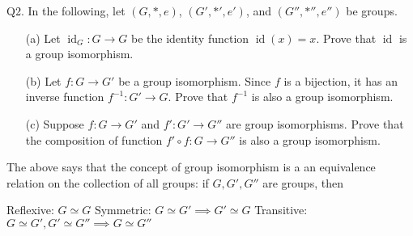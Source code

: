 \newpage
Q2.
In the following, let $(G, *, e)$, $(G', *', e')$, and $(G'', *'', e'')$ be
groups.
\begin{enumerate}[nosep]

\item[(a)]
Let $\operatorname{id}_G : G \rightarrow G$ be the identity function
$\operatorname{id}(x) = x$. Prove that $\operatorname{id}$ is a group isomorphism.

\item[(b)] Let $f : G \rightarrow G'$ be a group isomorphism.
Since $f$ is a bijection, it has an inverse function
$f^{-1}: G' \rightarrow G$. Prove that $f^{-1}$ is also a group isomorphism.

\item[(c)] Suppose
$f : G \rightarrow G'$ and
$f': G' \rightarrow G''$
are group isomorphisms.
Prove that the composition of function $f' \circ f: G \rightarrow G''$ is
also a group isomorphism.

\end{enumerate}
The above says that the concept of group isomorphism is a an
equivalence relation on the collection of all groups: if $G, G', G''$ are groups,
then
\begin{enumerate}[nosep]
\li Reflexive: $G \simeq G$
\li Symmetric: $G \simeq G' \implies G' \simeq G$
\li Transitive: $G \simeq G', G' \simeq G'' \implies G \simeq G''$
\end{enumerate}

\SOLUTION



